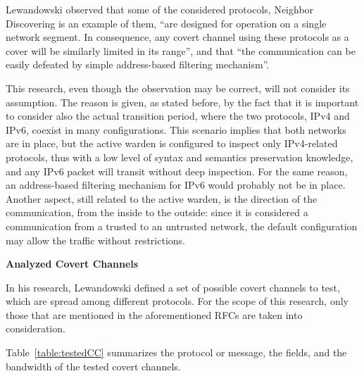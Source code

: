 \documentclass[12pt]{article}
\begin{document}
Lewandowski observed that some of the considered protocols, Neighbor Discovering is an example of them, ``are designed for operation on a single network segment. In consequence, any covert channel using these protocols as a cover will be similarly limited in its range'', and that ``the communication can be easily defeated by simple address-based filtering mechanism''.

This research, even though the observation may be correct, will not consider its assumption. The reason is given, as stated before, by the fact that it is important to consider also the actual transition period, where the two protocols, IPv4 and IPv6, coexist in many configurations. This scenario implies that both networks are in place, but the active warden is configured to inspect only IPv4-related protocols, thus with a low level of syntax and semantics preservation knowledge, and any IPv6 packet will transit without deep inspection. For the same reason, an address-based filtering mechanism for IPv6 would probably not be in place. Another aspect, still related to the active warden, is the direction of the communication, from the inside to the outside: since it is considered a communication from a trusted to an untrusted network, the default configuration may allow the traffic without restrictions.


\textbf{Analyzed Covert Channels}

In his research, Lewandowski defined a set of possible covert channels to test, which are spread among different protocols. For the scope of this research, only those that are mentioned in the aforementioned RFCs are taken into consideration.

Table~\ref{table:testedCC} summarizes the protocol or message, the fields, and the bandwidth of the tested covert channels.
\end{document}
